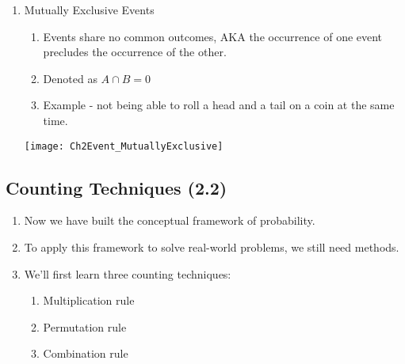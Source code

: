 \documentclass[../IND E 315.tex]{subfiles}
\begin{document}
\begin{enumerate}
\begin{center}
        \end{center}
    \item Mutually Exclusive Events
        \begin{enumerate}
            \item Events share no common outcomes, AKA the occurrence of one event precludes the occurrence of the other.
            \item Denoted as $A \cap B = 0$ 
            \item Example - not being able to roll a head and a tail on a coin at the same time.
        \end{enumerate}
        \begin{center}
            \texttt{[image: Ch2Event\_MutuallyExclusive]}
        \end{center}
\end{enumerate}

\subsection*{Counting Techniques (2.2)}
\begin{enumerate}
    \item Now we have built the conceptual framework of probability.
    \item To apply this framework to solve real-world problems, we still need methods. 
    \item We'll first learn three counting techniques:
        \begin{enumerate}
            \item Multiplication rule
            \item Permutation rule
            \item Combination rule
        \end{enumerate}
\end{enumerate}
\end{document}

